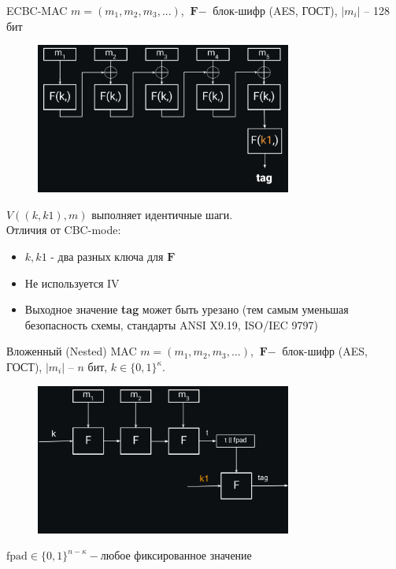 \documentclass[usenames,dvipsnames,8pt,aspectratio=169]{beamer}
\begin{document}
\begin{frame}{ECBC-MAC }
\Large
 $m = (m_1, m_2, m_3, ...)$, $\textbf{F}-$ блок-шифр (AES, ГОСТ), $|m_i|$  --  128 бит
	\begin{figure}
		\includegraphics[width=0.75\textwidth]{CBC_MAC}
	\end{figure}
\vspace{-90pt}

\Large 
$V((k, k1), m)$ выполняет идентичные шаги.\\[10pt]

Отличия от CBC-mode:
\begin{itemize}
	\itemsep 5pt
	\item $k, k1$ - два {\color{Orange} разных} ключа для $\textbf{F}$
	\item Не используется IV
	\item Выходное значение \textbf{tag} может быть урезано (тем самым уменьшая безопасность схемы, стандарты ANSI X9.19, ISO/IEC 9797)
\end{itemize}

\end{frame}


\begin{frame}{Вложенный (Nested) MAC}
	\Large
	\vspace{-25pt}
	$m = (m_1, m_2, m_3, ...)$, $\textbf{F}-$ блок-шифр (AES, ГОСТ), $|m_i|$ -- $n$ бит, $k  \in \{0,1\}^\kappa$.
	\begin{figure}
		\includegraphics[width=0.75\textwidth]{NMAC}
	\end{figure}
\vspace{-40pt}
$
	\text{fpad} \in \{0,1\}^{n - \kappa} -\text{любое фиксированное значение}
$
\end{frame}
\end{document}
